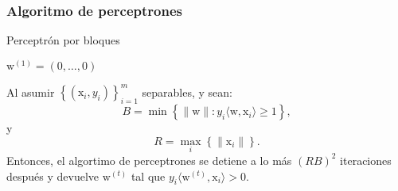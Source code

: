 \documentclass[8pt,a4paper]{extarticle}
\begin{document}
\begin{multicols}{3}
	\subsubsection{Algoritmo de perceptrones}

	\begin{algorithm}[H]
		\caption{Perceptrón por bloques}
		$ \mathrm{w}^{(1)} = (0, \ldots, 0)$\\
	\end{algorithm}

	\begin{boxtheo}[]
		Al asumir $\left\{\left(\mathrm{x}_i, y_i \right)\right\}_{i=1}^m$ separables, y sean:
		$$B = \min \left\{ \| \mathrm{w} \| : y_i \langle \mathrm{w}, \mathrm{x}_i \rangle \ge 1 \right\},$$
		y
		$$\displaystyle R = \max_{i} \left\{ \| \mathrm{x}_i \| \right\}.$$
		Entonces, el algortimo de perceptrones se detiene a lo más $\left( RB \right)^2 $ iteraciones después y devuelve $\mathrm{w}^{(t)}$ tal que $y_i \langle \mathrm{w}^{(t)}, \mathrm{x}_i \rangle > 0$.
	\end{boxtheo}

	\vfill\eject
	\columnbreak
\end{multicols}
\end{document}
